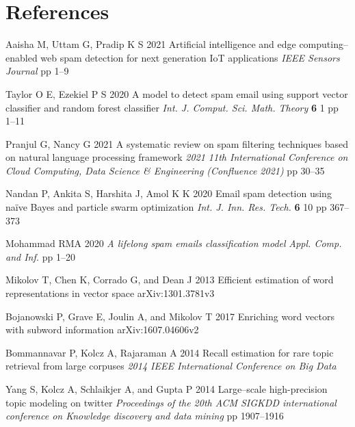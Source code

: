 \documentclass[12pt]{jpconf}
\begin{document}
\section*{References}
\begin{thebibliography}{99}
Aaisha M, Uttam G, Pradip K S
2021 {Artificial intelligence and edge computing--enabled
	web spam detection for next generation IoT
	applications} {\it IEEE Sensors Journal} {\bf } pp 1--9

Taylor O E, Ezekiel P S
2020 {A model to detect spam email using support vector classifier and random forest classifier} 
\emph{Int. J. Comput. Sci. Math. Theory} {\bf 6} 1 pp 1--11

Pranjul G, Nancy G
2021 {A systematic review on spam filtering techniques based on
natural language processing framework} \emph{2021 11th International Conference on Cloud Computing, Data Science \& Engineering (Confluence 2021)} pp 30--35

Nandan P, Ankita S, Harshita J, Amol K K
2020 {Email spam detection using naïve Bayes and particle swarm optimization} \emph{Int. J. Inn. Res. Tech.} {\bf 6} 10 pp 367--373

Mohammad RMA
2020 \emph{A lifelong spam emails classification model}
\emph{Appl. Comp. and Inf.} pp 1--20

Mikolov T, Chen K, Corrado G, and Dean J
2013 {Efficient estimation of word representations in vector space} 
arXiv:1301.3781v3

Bojanowski P, Grave E, Joulin A, and Mikolov T
2017 {Enriching word vectors with subword information} 
arXiv:1607.04606v2

Bommannavar P, Kolcz A, Rajaraman A
2014 {Recall estimation for rare topic retrieval from large corpuses}
\emph{2014 IEEE International Conference on Big Data}

Yang S, Kolcz A, Schlaikjer A, and Gupta P
2014 {Large--scale high-precision topic modeling on twitter} 
\emph{Proceedings of the 20th ACM SIGKDD international conference on Knowledge discovery and data mining} pp 1907--1916

\end{thebibliography}
\end{document}
